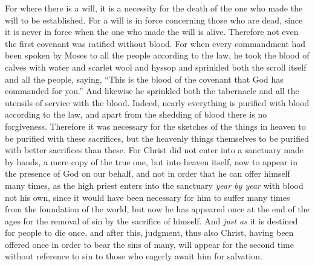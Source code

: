 \begin{biblechapter}
\verse For where there is a will, it is a necessity for the death of the one who made the will to be established.
\verse For a will is in force concerning those who are dead, since it is never in force when the one who made the will is alive.
\verse Therefore not even the first covenant was ratified without blood.
\verse For when every commandment had been spoken by Moses to all the people according to the law, he took the blood of calves with water and scarlet wool and hyssop and sprinkled both the scroll itself and all the people,
\verse saying, “This is the blood of the covenant that God has commanded for you.”
\verse And likewise he sprinkled both the tabernacle and all the utensils of service with the blood.
\verse Indeed, nearly everything is purified with blood according to the law, and apart from the shedding of blood there is no forgiveness.
\verse Therefore it was necessary for the sketches of the things in heaven to be purified with these sacrifices, but the heavenly things themselves to be purified with better sacrifices than these.
\verse For Christ did not enter into a sanctuary made by hands, a mere copy of the true one, but into heaven itself, now to appear in the presence of God on our behalf,
\verse and not in order that he can offer himself many times, as the high priest enters into the sanctuary \textit{year by year} with blood not his own,
\verse since it would have been necessary for him to suffer many times from the foundation of the world, but now he has appeared once at the end of the ages for the removal of sin by the sacrifice of himself.
\verse And \textit{just as} it is destined for people to die once, and after this, judgment,
\verse thus also Christ, having been offered once in order to bear the sins of many, will appear for the second time without reference to sin to those who eagerly await him for salvation.
\end{biblechapter}

